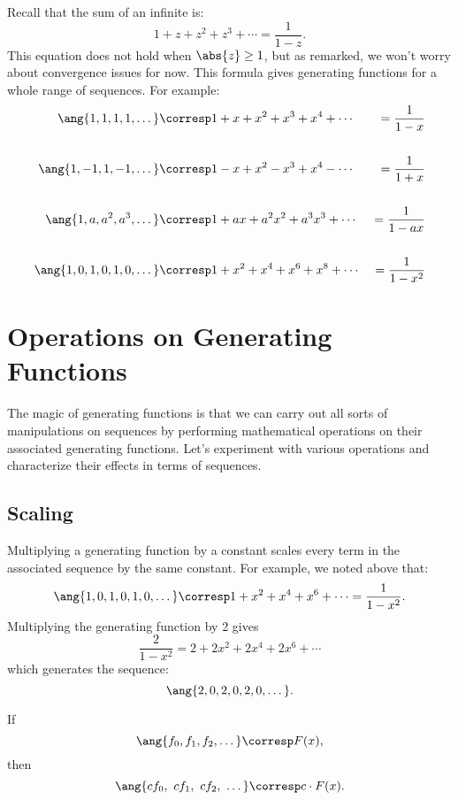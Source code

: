 Recall that the sum of an infinite  is:
%
\[
    1 + z + z^2 + z^3 + \cdots = \frac{1}{1 - z}.
\]
%
This equation does not hold when $\abs{z} \geq 1$, but as remarked, we
won't worry about convergence issues for now.  This formula gives
 generating functions for a whole range of sequences.
For example:
%
\begin{alignat*}{3}
\ang{1, 1, 1, 1, \dots}
    & \corresp 1 + x + x^2 + x^3 + x^4 + \cdots
    & {}= \dfrac{1}{1-x} \\
\\
\ang{1, -1, 1, -1, \dots}
    & \corresp 1 - x + x^2 - x^3 + x^4 - \cdots
    &  {}= \dfrac{1}{1+x} \\
\\
\ang{1, a, a^2, a^3, \dots}
    & \corresp 1 + a x + a^2 x^2 + a^3 x^3 + \cdots
    &  {}= \dfrac{1}{1-ax} \\
\\
\ang{1, 0, 1, 0, 1, 0, \dots}
    & \corresp 1 + x^2 + x^4 + x^6 + x^8 + \cdots
    & {}= \dfrac{1}{1 - x^2}
\end{alignat*}

\section{Operations on Generating Functions}

The magic of generating functions is that we can carry out all sorts
of manipulations on sequences by performing mathematical operations on
their associated generating functions.  Let's experiment with various
operations and characterize their effects in terms of sequences.

\subsection{Scaling}

Multiplying a generating function by a constant scales every term in
the associated sequence by the same constant.  For example, we noted
above that:
%
\[
\ang{1, 0, 1, 0, 1, 0, \dots}
    \corresp 1 + x^2 + x^4 + x^6 + \cdots = \frac{1}{1 - x^2}.
\]
%
Multiplying the generating function by 2 gives
%
\[
    \frac{2}{1 - x^2} = 2 + 2 x^2 + 2 x^4 + 2 x^6 + \cdots
\]
%
which generates the sequence:
%
\[
    \ang{2, 0, 2, 0, 2, 0, \dots}.
\]

\begin{rul}
\label{rule:scaling}
If
\[\ang{f_0, f_1, f_2, \dots} \corresp F(x),\]
then
%
\[
\ang{c f_0,\ c f_1,\ c f_2,\ \dots} \corresp c \cdot F(x).
\]
\end{rul}

